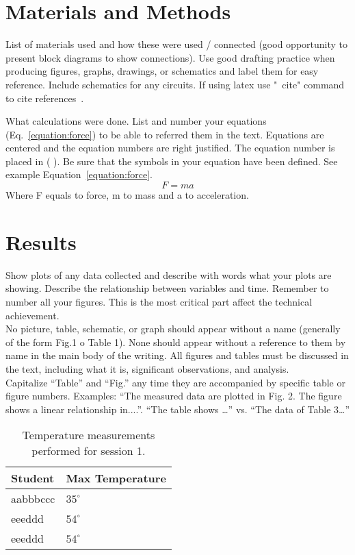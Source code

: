 \documentclass[journal]{IEEEtran}
\begin{document}
\section{Materials and Methods}
List of materials used and how these were used / connected (good opportunity to present block diagrams to show connections).
Use good drafting practice when producing figures, graphs, drawings, or schematics and label them for easy
reference. Include schematics for any circuits. 
If using latex use "~cite" command to cite references~\cite{Kulkarni2015}.

What calculations were done. List and number your equations (Eq.~\ref{equation:force}) to be able to referred them in the text. Equations are centered and the equation numbers are right justified. The equation number is placed in ( ). Be sure that the symbols in your equation have been defined. See example Equation~\ref{equation:force}. 
\begin{equation}
    F = ma
    \label{equation:force}
\end{equation}
Where F equals to force, m to mass and a to acceleration.  

\section{Results}
Show plots of any data collected and describe with words what your plots are showing. Describe the relationship between variables and time. Remember to number all your figures.  This is the most critical part affect the technical achievement.\\
No picture, table, schematic, or graph should appear without a name (generally of the form Fig.1 o Table 1). %
None should appear without a reference to them by name in the main body of the writing.
All figures and tables must be discussed in the text, including what it is, significant observations, and analysis. \\
Capitalize “Table” and “Fig.” any time they are accompanied by specific table or figure numbers. Examples: “The measured data are plotted in Fig. 2. The figure shows a linear relationship in....”. “The table shows …” vs. “The data of Table 3…” \\

\begin{table}[!ht] %
\centering
\label{table:Exps}
\begin{tabular}{ll}
Student &  Max Temperature \\ \hline
aabbbccc &  $35^{\circ}$   \\
eeeddd &   $54^{\circ}$ \\
eeeddd &   $54^{\circ}$ \\
\end{tabular}
\caption{Temperature measurements performed for session 1.}
\end{table}
\end{document}
